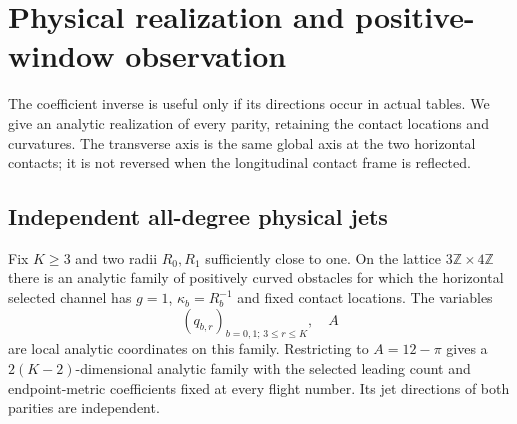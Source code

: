 \section{Physical realization and positive-window observation}
\label{sec:physical}
The coefficient inverse is useful only if its directions occur in actual
tables. We give an analytic realization of every parity, retaining the
contact locations and curvatures. The transverse axis is the same global
axis at the two horizontal contacts; it is not reversed when the
longitudinal contact frame is reflected.

\subsection{Independent all-degree physical jets}
\begin{proposition}\label{prop:realization}
Fix $K\ge3$ and two radii $R_0,R_1$ sufficiently close to one.
On the lattice $3\mathbb Z\times4\mathbb Z$ there is an analytic
family of positively curved obstacles for which the horizontal selected
channel has $g=1$, $\kappa_b=R_b^{-1}$ and fixed contact locations.
The variables
\[
 (q_{b,r})_{b=0,1;\,3\le r\le K},\quad A
\]
are local analytic coordinates on this family. Restricting to
$A=12-\pi$ gives a $2(K-2)$-dimensional analytic family with the
selected leading count and endpoint-metric coefficients fixed at every
flight number. Its jet directions of both parities are independent.
\end{proposition}
